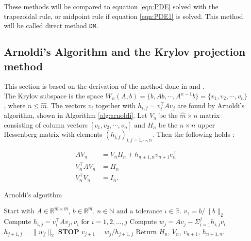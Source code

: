 These methods will be compared to equation \eqref{eqn:PDE} solved with the trapezoidal rule, or midpoint rule if equation \eqref{eqn:PDE1} is solved. This method will be called direct method \texttt{DM}. 



\subsection{Arnoldi's Algorithm and the Krylov projection method} %
This section is based on the derivation of the method done in \cite{elena} and \cite{min}. \\

\noindent The Krylov subspace is the space $W_n (A,b) = \{b,Ab, \cdots, A^{n-1}b\} = \{v_1,v_2,\cdots,v_n\} $, where $n \leq \hat{m}$.
The vectors $v_i$ together with $h_{i,j} = v_i^\top Av_j$ are found by Arnoldi's algorithm, shown in Algorithm \ref{alg:arnoldi}. Let $V_n$ be the $\hat{m} \times n$ matrix consisting of column vectors $[v_1,v_2,\cdots,v_n ] $ and $H_n$ be the $n \times n$ upper Hessenberg matrix with elements $(h_{i,j})_{i,j=1,\cdots,n}$. Then the following holds \cite{kryprop}:

\begin{equation}
\begin{aligned}
AV_n & = V_n H_n + h_{n+1,n}v_{n+1}e^\top_n  \\
V^{\top}_n AV_n &= H_n  \\
V_n^{\top} V_n &= I_n. 
\label{eqn:propA}
\end{aligned}
\end{equation}

\begin{algorithm} [h!]
\begin{algorithmic} \caption{Arnoldi's algorithm\cite{arnold}} \label{alg:arnoldi}  
\STATE Start with $A \in \mathbb{R}^{\hat{m} \times \hat{m}}$, $b \in \mathbb{R}^{\hat{m}}$, $n \in \mathbb{N}$ and a tolerance $\iota \in \mathbb{R}$.
\STATE $v_1 = b/\|b \|_2$
   \STATE Compute $h_{i,j} =  v_i^{\top}Av_j,v_i $ for $i = 1,2,\dots, j$
    \STATE Compute $w_j = A v_j - \Sigma_{i=1}^{j} h_{i,j}v_i $
    \STATE $h_{j+1,j} = \| w_j \|_2$
        \STATE\textbf{STOP}
    \ENDIF 
   \STATE $v_{j+1} = w_j/h_{j+1,j}$
\ENDFOR
\STATE Return $H_n$, $V_n$, $v_{n+1}$, $h_{n+1,n}$.
\end{algorithmic} 
\end{algorithm}



